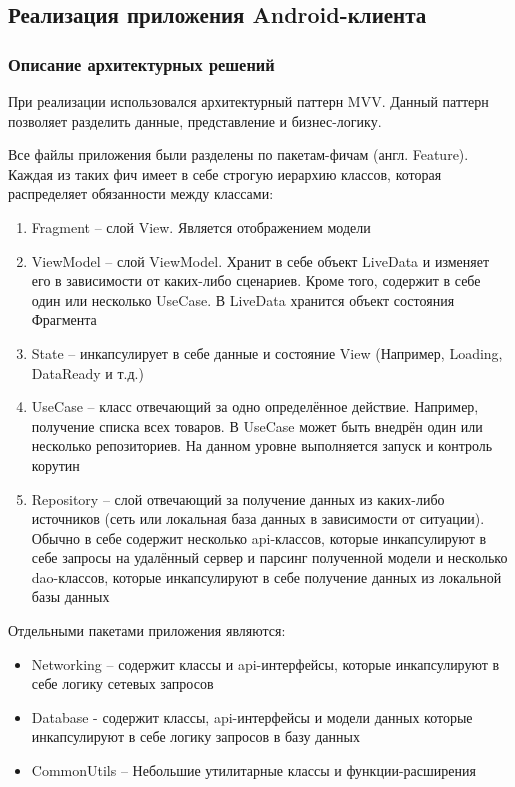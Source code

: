 \subsection{Реализация приложения Android-клиента}\label{subsec:3-impl-android}\indent

\subsubsection{Описание архитектурных решений}

При реализации использовался архитектурный паттерн MVV. Данный паттерн позволяет разделить данные, представление и бизнес-логику.

Все файлы приложения были разделены по пакетам-фичам (англ. Feature). Каждая из таких фич имеет в себе строгую иерархию классов, которая распределяет обязанности между классами:
\begin{enumerate}
    \item Fragment – слой View.
    Является отображением модели
    \item ViewModel – слой ViewModel.
    Хранит в себе объект LiveData и изменяет его в зависимости от каких-либо сценариев.
    Кроме того, содержит в себе один или несколько UseCase.
    В LiveData хранится объект состояния Фрагмента
    \item State – инкапсулирует в себе данные и состояние View (Например, Loading, DataReady и т.д.)
    \item UseCase – класс отвечающий за одно определённое действие.
    Например, получение списка всех товаров.
    В UseCase может быть внедрён один или несколько репозиториев.
    На данном уровне выполняется запуск и контроль корутин
    \item Repository – слой отвечающий за получение данных из каких-либо источников (сеть или локальная база данных в зависимости от ситуации).
    Обычно в себе содержит несколько api-классов, которые инкапсулируют в себе запросы на удалённый сервер и парсинг полученной модели и несколько dao-классов, которые инкапсулируют в себе получение данных из локальной базы данных
\end{enumerate}

Отдельными пакетами приложения являются:
\begin{itemize}
    \item Networking – содержит классы и api-интерфейсы, которые инкапсулируют в себе логику сетевых запросов
    \item Database - содержит классы, api-интерфейсы и модели данных которые инкапсулируют в себе логику запросов в базу данных
    \item CommonUtils – Небольшие утилитарные классы и функции-расширения
\end{itemize}

